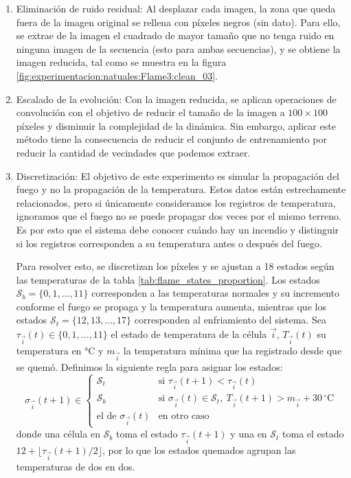 \begin{enumerate}
	Sin embargo, las imágenes resultantes generan bordes negros que representan el movimiento de la imagen. Esto genera ruido en los bordes, lo que nos obliga a reducir el tamaño de los datos.
	
	\item Eliminación de ruido residual: Al desplazar cada imagen, la zona que queda fuera de la imagen original se rellena con píxeles negros (sin dato). Para ello, se extrae de la imagen el cuadrado de mayor tamaño que no tenga ruido en ninguna imagen de la secuencia (esto para ambas secuencias), y se obtiene la imagen reducida, tal como se muestra en la figura \ref{fig:experimentacion:natuales:Flame3:clean_03}.
	
	\item Escalado de la evolución: Con la imagen reducida, se aplican operaciones de convolución con el objetivo de reducir el tamaño de la imagen a $100 \times 100$ píxeles y disminuir la complejidad de la dinámica. Sin embargo, aplicar este método tiene la consecuencia de reducir el conjunto de entrenamiento por reducir la cantidad de vecindades que podemos extraer. 
	
	 \item Discretización: El objetivo de este experimento es simular la propagación del fuego y no la propagación de la temperatura. Estos datos están estrechamente relacionados, pero si únicamente consideramos los registros de temperatura, ignoramos que el fuego no se puede propagar dos veces por el mismo terreno. Es por esto que el sistema debe conocer cuándo hay un incendio y distinguir si los registros corresponden a su temperatura antes o después del fuego. 
	 
	 Para resolver esto, se discretizan los píxeles y se ajustan a 18 estados según las temperaturas de la tabla \ref{tab:flame_states_proportion}. Los estados $ \mathcal{S}_b = \{0, 1, \dots, 11\}$ corresponden a las temperaturas normales y su incremento conforme el fuego se propaga y la temperatura aumenta, mientras que los estados $\mathcal{S}_t = \{12, 13, \dots, 17\}$ corresponden al enfriamiento del sistema. Sea $\tau_{\vec{i}}(t) \in \{0, 1, \dots, 11\}$ el estado de temperatura de la célula $\vec{i}$, $T_{\vec{i}}(t)$ su temperatura en °C y $m_{\vec{i}}$ la temperatura mínima que ha registrado desde que se quemó. Definimos la siguiente regla para asignar los estados:
	 \[
	 	\sigma_{\vec{i}}(t + 1) \in
	 	\begin{cases}
	 		\mathcal{S}_t & \text{si } \tau_{\vec{i}}(t + 1) < \tau_{\vec{i}}(t) \\
	 		\mathcal{S}_b & \text{si } \sigma_{\vec{i}}(t) \in \mathcal{S}_t,\ T_{\vec{i}}(t + 1) > m_{\vec{i}} + 30\,^\circ\mathrm{C} \\
	 		\text{el de } \sigma_{\vec{i}}(t) & \text{en otro caso}
	 	\end{cases}
	 \]
	 donde una célula en $\mathcal{S}_b$ toma el estado $\tau_{\vec{i}}(t + 1)$ y una en $\mathcal{S}_t$ toma el estado $12 + \lfloor \tau_{\vec{i}}(t + 1) / 2 \rfloor$, por lo que los estados quemados agrupan las temperaturas de dos en dos.


\end{enumerate}
